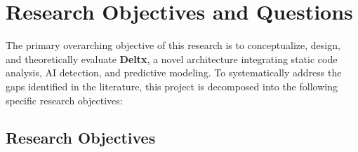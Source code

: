 \section{Research Objectives and Questions}

The primary overarching objective of this research is to conceptualize, design, and theoretically evaluate \textbf{Deltx}, a novel architecture integrating static code analysis, AI detection, and predictive modeling. To systematically address the gaps identified in the literature, this project is decomposed into the following specific research objectives:

\subsection{Research Objectives}

